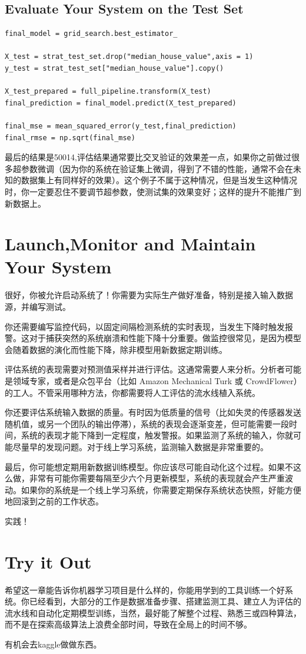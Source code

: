 \documentclass[UTF8]{ctexart}
\begin{document}
\subsection{Evaluate Your System on the Test Set}

\begin{lstlisting}
final_model = grid_search.best_estimator_

X_test = strat_test_set.drop("median_house_value",axis = 1)
y_test = strat_test_set["median_house_value"].copy()

X_test_prepared = full_pipeline.transform(X_test)
final_prediction = final_model.predict(X_test_prepared)

final_mse = mean_squared_error(y_test,final_prediction)
final_rmse = np.sqrt(final_mse)
\end{lstlisting}

最后的结果是50014,评估结果通常要比交叉验证的效果差一点，如果你之前做过很多超参数微调（因为你的系统在验证集上微调，得到了不错的性能，通常不会在未知的数据集上有同样好的效果）。这个例子不属于这种情况，但是当发生这种情况时，你一定要忍住不要调节超参数，使测试集的效果变好；这样的提升不能推广到新数据上。

\section{Launch,Monitor and Maintain Your System}

很好，你被允许启动系统了！你需要为实际生产做好准备，特别是接入输入数据源，并编写测试。

你还需要编写监控代码，以固定间隔检测系统的实时表现，当发生下降时触发报警。这对于捕获突然的系统崩溃和性能下降十分重要。做监控很常见，是因为模型会随着数据的演化而性能下降，除非模型用新数据定期训练。

评估系统的表现需要对预测值采样并进行评估。这通常需要人来分析。分析者可能是领域专家，或者是众包平台（比如 Amazon Mechanical Turk 或 CrowdFlower）的工人。不管采用哪种方法，你都需要将人工评估的流水线植入系统。

你还要评估系统输入数据的质量。有时因为低质量的信号（比如失灵的传感器发送随机值，或另一个团队的输出停滞），系统的表现会逐渐变差，但可能需要一段时间，系统的表现才能下降到一定程度，触发警报。如果监测了系统的输入，你就可能尽量早的发现问题。对于线上学习系统，监测输入数据是非常重要的。

最后，你可能想定期用新数据训练模型。你应该尽可能自动化这个过程。如果不这么做，非常有可能你需要每隔至少六个月更新模型，系统的表现就会产生严重波动。如果你的系统是一个线上学习系统，你需要定期保存系统状态快照，好能方便地回滚到之前的工作状态。

实践！


\section{Try it Out}
希望这一章能告诉你机器学习项目是什么样的，你能用学到的工具训练一个好系统。你已经看到，大部分的工作是数据准备步骤、搭建监测工具、建立人为评估的流水线和自动化定期模型训练，当然，最好能了解整个过程、熟悉三或四种算法，而不是在探索高级算法上浪费全部时间，导致在全局上的时间不够。

有机会去kaggle做做东西。
\end{document}
